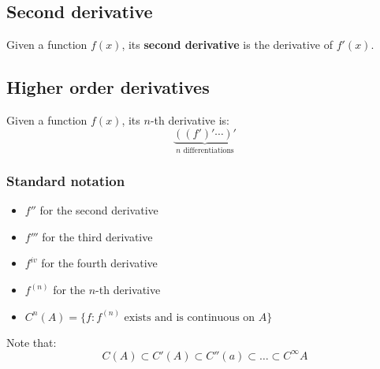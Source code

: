 \documentclass[11pt]{article}
\begin{document}
\begin{center}
\end{center}

\begin{center}
\end{center}

\newpage
\subsection{Second derivative}
\label{sec:org9780f4d}
Given a function \(f(x)\), its \textbf{second derivative} is the derivative of \(f'(x)\).
\subsection{Higher order derivatives}
\label{sec:org06d354d}
Given a function \(f(x)\), its \(n\)-th derivative is:
\[\underbrace{((f')' \cdots )'}_{n \text{ differentiations}}\]
\subsubsection{Standard notation}
\label{sec:org5f75442}
\begin{itemize}
\item \(f''\) for the second derivative
\item \(f'''\) for the third derivative
\item \(f^{iv}\) for the fourth derivative
\item \(f^{(n)}\) for the \(n\)-th derivative
\item \(C^n (A) = \{f: f^{(n)} \text{ exists and is continuous on } A\}\)
\end{itemize}

Note that:
\[C(A) \subset C'(A) \subset C''(a) \subset \ldots \subset C^{\infty} A\]
\end{document}
